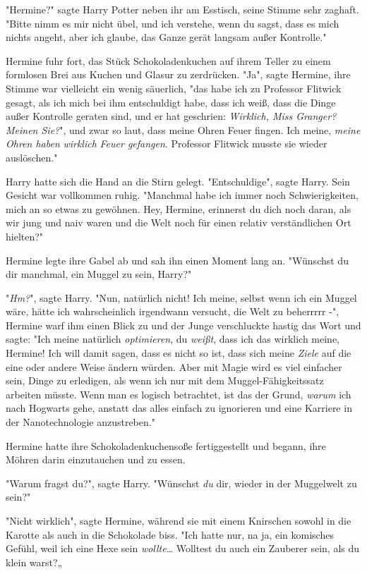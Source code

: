 {"Hermine?" sagte Harry Potter neben ihr am Esstisch, seine Stimme sehr zaghaft. "Bitte nimm es mir nicht übel, und ich verstehe, wenn du sagst, dass es mich nichts angeht, aber ich glaube, das Ganze gerät langsam außer Kontrolle."

Hermine fuhr fort, das Stück Schokoladenkuchen auf ihrem Teller zu einem formlosen Brei aus Kuchen und Glasur zu zerdrücken. "Ja", sagte Hermine, ihre Stimme war vielleicht ein wenig säuerlich, "das habe ich zu Professor Flitwick gesagt, als ich mich bei ihm entschuldigt habe, dass ich weiß, dass die Dinge außer Kontrolle geraten sind, und er hat geschrien: \emph{Wirklich, Miss Granger? Meinen Sie?}", und zwar so laut, dass meine Ohren Feuer fingen. Ich meine, \emph{meine Ohren haben} \emph{wirklich} \emph{Feuer gefangen}. Professor Flitwick musste sie wieder auslöschen."

Harry hatte sich die Hand an die Stirn gelegt. "Entschuldige", sagte Harry. Sein Gesicht war vollkommen ruhig. "Manchmal habe ich immer noch Schwierigkeiten, mich an so etwas zu gewöhnen. Hey, Hermine, erinnerst du dich noch daran, als wir jung und naiv waren und die Welt noch für einen relativ verständlichen Ort hielten?"

Hermine legte ihre Gabel ab und sah ihn einen Moment lang an. "Wünschst du dir manchmal, ein Muggel zu sein, Harry?"

"\emph{Hm?}", sagte Harry. "Nun, natürlich nicht! Ich meine, selbst wenn ich ein Muggel wäre, hätte ich wahrscheinlich irgendwann versucht, die Welt zu beherrrrr -", Hermine warf ihm einen Blick zu und der Junge verschluckte hastig das Wort und sagte: "Ich meine natürlich \emph{optimieren}, du \emph{weißt}, dass ich das wirklich meine, Hermine! Ich will damit sagen, dass es nicht so ist, dass sich meine \emph{Ziele} auf die eine oder andere Weise ändern würden. Aber mit Magie wird es viel einfacher sein, Dinge zu erledigen, als wenn ich nur mit dem Muggel-Fähigkeitssatz arbeiten müsste. Wenn man es logisch betrachtet, ist das der Grund, \emph{warum} ich nach Hogwarts gehe, anstatt das alles einfach zu ignorieren und eine Karriere in der Nanotechnologie anzustreben."

Hermine hatte ihre Schokoladenkuchensoße fertiggestellt und begann, ihre Möhren darin einzutauchen und zu essen.

"Warum fragst du?", sagte Harry. "Wünschst \emph{du} dir, wieder in der Muggelwelt zu sein?"

"Nicht wirklich", sagte Hermine, während sie mit einem Knirschen sowohl in die Karotte als auch in die Schokolade biss. "Ich hatte nur, na ja, ein komisches Gefühl, weil ich eine Hexe sein \emph{wollte}… Wolltest du auch ein Zauberer sein, als du klein warst?„

}
